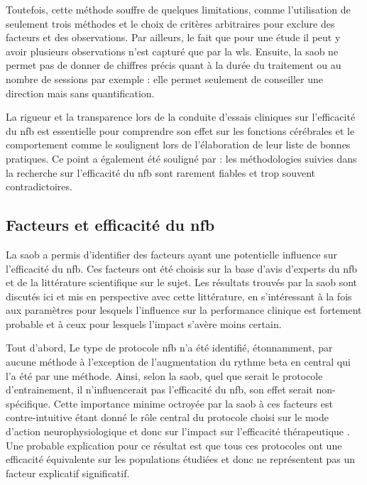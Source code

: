 Toutefois, cette méthode souffre de quelques limitations, comme 
l'utilisation de seulement trois méthodes et le choix de critères arbitraires pour exclure des facteurs et des observations. Par ailleurs, le fait que pour une étude il peut y 
avoir plusieurs observations n'est capturé que par la \gls{wls}. Ensuite, la \gls{saob} ne permet pas de donner de chiffres précis quant à la durée du traitement ou au 
nombre de sessions par exemple : elle permet seulement de conseiller une direction mais sans quantification.

La rigueur et la transparence lors de la conduite d'essais cliniques sur l'efficacité
du \gls{nfb} est essentielle pour comprendre son effet sur les fonctions cérébrales et le comportement comme le soulignent \citet{Ros2019} lors de l'élaboration
de leur liste de bonnes pratiques. Ce point a également été souligné par \citet{Rogala2016} : les méthodologies suivies dans la recherche sur l'efficacité du
\gls{nfb} sont rarement fiables et trop souvent contradictoires.

\subsection{Facteurs et efficacité du \gls{nfb}} \label{discussion_factors}

La \gls{saob} a permis d'identifier des facteurs ayant une potentielle influence sur l'efficacité du \gls{nfb}. Ces facteurs ont été choisis sur la base d'avis d'experts
du \gls{nfb} et de la littérature scientifique sur le sujet. Les résultats trouvés par la \gls{saob} sont discutés ici et mis en perspective avec cette littérature, en s'intéressant à la fois 
aux paramètres pour lesquels l'influence sur la performance clinique est fortement probable et à ceux pour lesquels l'impact s'avère moins certain. 

Tout d'abord, Le type de protocole \gls{nfb} n'a été identifié, étonnamment, par aucune méthode à l'exception de l'augmentation du rythme beta en central qui l'a été par une méthode. 
Ainsi, selon la \gls{saob}, quel que serait le protocole d'entrainement, il n'influencerait pas l'efficacité du \gls{nfb}, son effet serait non-spécifique. Cette importance 
minime octroyée par la \gls{saob} à ces facteurs est contre-intuitive étant donné le rôle central du protocole choisi sur le mode d'action neurophysiologique 
et donc sur l'impact sur l'efficacité thérapeutique \citep{Vernon2004, Heinrich2019}. Une probable 
explication pour ce résultat est que tous ces protocoles ont une efficacité équivalente sur les populations étudiées et donc ne représentent 
pas un facteur explicatif significatif.
  

